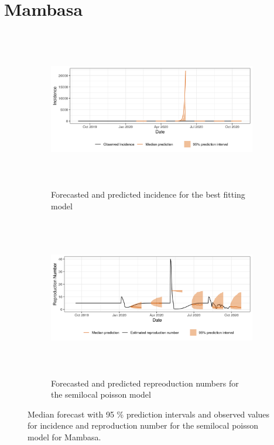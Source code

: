  \section{ Mambasa }\begin{figure}[H]\begin{subfigure}{\textwidth}  \centering  \includegraphics[width=0.9\linewidth, height=7cm]{../output/Mambasa_predictions.png}  \caption{Forecasted and predicted incidence for the best fitting model}\end{subfigure}

\begin{subfigure}{\textwidth}  \centering  \includegraphics[width=0.9\linewidth, height=7cm]{../output/Mambasa_Rs.png}  \caption{Forecasted and predicted repreoduction numbers for the semilocal poisson model}\end{subfigure}  \caption{Median forecast with 95 \% prediction intervals and observed values for incidence and reproduction number for the semilocal poisson model for Mambasa.}\end{figure}

